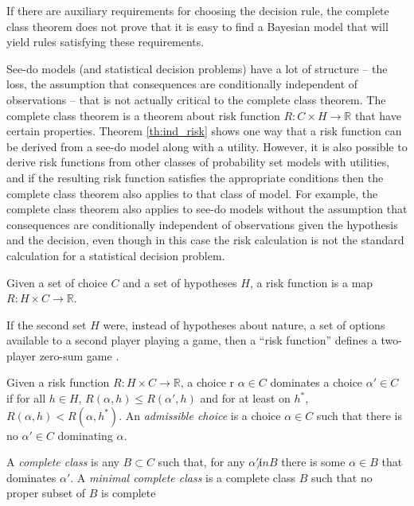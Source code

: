 If there are auxiliary requirements for choosing the decision rule, the complete class theorem does not prove that it is easy to find a Bayesian model that will yield rules satisfying these requirements.

See-do models (and statistical decision problems) have a lot of structure -- the loss, the assumption that consequences are conditionally independent of observations -- that is not actually critical to the complete class theorem. The complete class theorem is a theorem about risk function $R:C\times H\to \mathbb{R}$ that have certain properties. Theorem \ref{th:ind_risk} shows one way that a risk function can be derived from a see-do model along with a utility. However, it is also possible to derive risk functions from other classes of probability set models with utilities, and if the resulting risk function satisfies the appropriate conditions then the complete class theorem also applies to that class of model. For example, the complete class theorem also applies to see-do models without the assumption that consequences are conditionally independent of observations given the hypothesis and the decision, even though in this case the risk calculation is not the standard calculation for a statistical decision problem.

\begin{definition}
Given a set of choice $C$ and a set of hypotheses $H$, a risk function is a map $R:H\times C\to \mathbb{R}$.
\end{definition}

If the second set $H$ were, instead of hypotheses about nature, a set of options available to a second player playing a game, then a ``risk function'' defines a two-player zero-sum game \citet{toutenburg_ferguson_1967}.

\begin{definition}\label{def:admissible_decision}
Given a risk function $R:H\times C\to \mathbb{R}$, a choice r $\alpha\in C$ dominates a choice $\alpha'\in C$ if for all $h\in H$, $R(\alpha,h)\leq R(\alpha',h)$ and for at least on $h^*$, $R(\alpha,h)<R(\alpha,h^*)$. An \emph{admissible choice} is a choice $\alpha\in C$ such that there is no $\alpha'\in C$ dominating $\alpha$.
\end{definition}

\begin{definition}
A \emph{complete class} is any $B\subset C$ such that, for any $\alpha'\not in B$ there is some $\alpha\in B$ that dominates $\alpha'$. A \emph{minimal complete class} is a complete class $B$ such that no proper subset of $B$ is complete
\end{definition}

